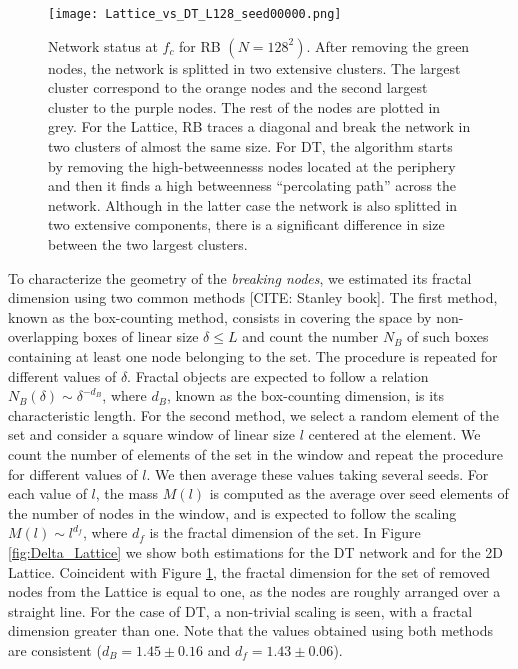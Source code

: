 \documentclass{article}
\begin{document}
\begin{figure}
\centering
\texttt{[image: Lattice\_vs\_DT\_L128\_seed00000.png]}
\caption{\label{fig:attack_draw} Network status at $f_c$ for RB $(N = 128^2)$. After removing the green nodes, the network is splitted in two extensive clusters. The largest cluster correspond to the orange nodes and the second largest cluster to the purple nodes. The rest of the nodes are plotted in grey. For the Lattice, RB traces a diagonal and break the network in two clusters of almost the same size. For DT, the algorithm starts by removing the high-betweennesss nodes located at the periphery and then it finds a high betweenness ``percolating path'' across  the network. Although in the latter case the network is also splitted in two extensive components, there is a significant difference in size between the two largest clusters. }
\end{figure}


To characterize the geometry of the \emph{breaking nodes}, we estimated its fractal dimension using two common methods [CITE: Stanley book]. The first method, known as the box-counting method, consists in covering the space by non-overlapping boxes of linear size $\delta \leq L$ and count the number $N_B$  of such boxes containing at least one node belonging to the set. The procedure is repeated for different values of $\delta$. Fractal objects are expected to follow a relation $N_B(\delta) \sim \delta^{-d_B}$, where $d_B$, known as the box-counting dimension, is its characteristic length. For the second method, we select a random element of the set and consider a square window of linear size $l$ centered at the element. We count the number of elements of the set in the window and repeat the procedure for different values of $l$. We then average these values taking several seeds. For each value of $l$, the mass $M(l)$ is computed as the average over seed elements of the number of nodes in the window, and is expected to follow the scaling $M(l)\sim l^{d_f}$, where $d_f$ is the fractal dimension of the set. In Figure \ref{fig:Delta_Lattice} we show both estimations for the DT network and for the 2D Lattice. Coincident with Figure \ref{fig:attack_draw}, the fractal dimension for the set of removed nodes from the Lattice is equal to one, as the nodes are roughly arranged over a straight line. For the case of DT, a non-trivial scaling is seen, with a fractal dimension greater than one. Note that the values obtained using both methods are consistent ($d_B = 1.45\pm 0.16$ and $d_f = 1.43\pm 0.06$).
\end{document}
